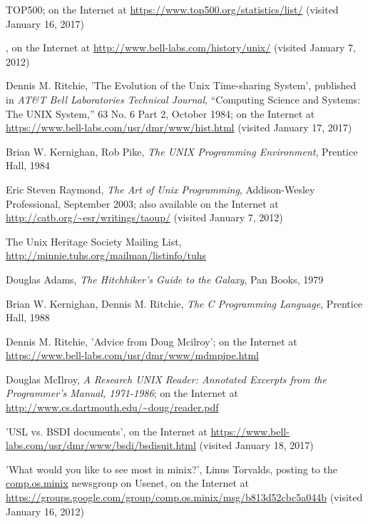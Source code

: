 
\begin{thebibliography}{99}

 TOP500; on the Internet at
\url{https://www.top500.org/statistics/list/}
(visited January 16, 2017)

, on the Internet at
\url{http://www.bell-labs.com/history/unix/}
(visited January 7, 2012)

Dennis M. Ritchie, 'The Evolution of the Unix
Time-sharing System', published in {\em AT\&T Bell Laboratories Technical
Journal}, ``Computing Science and Systems: The UNIX System,'' 63 No. 6
Part 2, October 1984;  on the Internet at
\url{https://www.bell-labs.com/usr/dmr/www/hist.html} (visited January 17, 2017)

Brian W. Kernighan, Rob Pike, {\em The UNIX
Programming Environment}, Prentice Hall, 1984

Eric Steven Raymond, {\em The Art of Unix Programming},
Addison-Wesley Professional, September 2003; also available on the
Internet at
\url{http://catb.org/~esr/writings/taoup/} (visited January 7, 2012)

The Unix Heritage Society Mailing List,
\url{http://minnie.tuhs.org/mailman/listinfo/tuhs}

Douglas Adams, {\em The Hitchhiker's Guide to the Galaxy},
Pan Books, 1979

Brian W. Kernighan, Dennis M. Ritchie, {\em The C Programming
Language}, Prentice Hall, 1988

Dennis M. Ritchie, 'Advice
from Doug Mcilroy'; on the Internet at
\url{https://www.bell-labs.com/usr/dmr/www/mdmpipe.html}

Douglas McIlroy, {\em
A Research UNIX Reader: Annotated Excerpts from the
Programmer's Manual, 1971-1986}; on the Internet at
\url{http://www.cs.dartmouth.edu/~doug/reader.pdf}

'USL vs. BSDI documents', on the Internet at
\url{https://www.bell-labs.com/usr/dmr/www/bsdi/bsdisuit.html} (visited January
18, 2017)

'What would you like to see most in minix?',
Linus Torvalds, posting to the \url{comp.os.minix} newsgroup on Usenet, on
the Internet at
\url{https://groups.google.com/group/comp.os.minix/msg/b813d52cbc5a044b}
(visited January 16, 2012)


\end{thebibliography}
